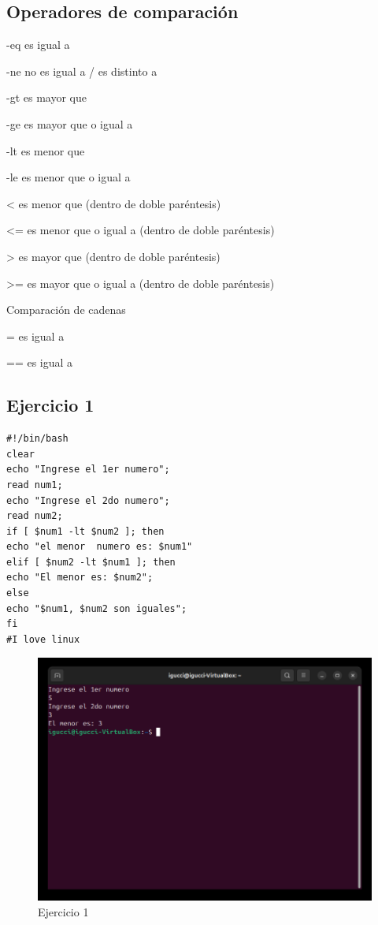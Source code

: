 \documentclass[11pt,twoside]{book}
\begin{document}
\subsection{Operadores de comparación}

-eq
es igual a

-ne
no es igual a / es distinto a

-gt
es mayor que

-ge
es mayor que o igual a

-lt
es menor que

-le
es menor que o igual a

<
es menor que (dentro de doble paréntesis)

<=
es menor que o igual a (dentro de doble paréntesis)

>
es mayor que (dentro de doble paréntesis)

>=
es mayor que o igual a (dentro de doble paréntesis)

Comparación de cadenas

=
es igual a

==
es igual a

\subsection{Ejercicio 1}
\begin{lstlisting}
#!/bin/bash
clear
echo "Ingrese el 1er numero";
read num1;
echo "Ingrese el 2do numero";
read num2;
if [ $num1 -lt $num2 ]; then
echo "el menor  numero es: $num1"
elif [ $num2 -lt $num1 ]; then
echo "El menor es: $num2";
else 
echo "$num1, $num2 son iguales";
fi
#I love linux
\end{lstlisting}
\begin{figure}
    \centering
    \includegraphics[width=0.5\linewidth]{Ej1.png}
    \caption{Ejercicio 1}
 
\end{figure}
\end{document}
